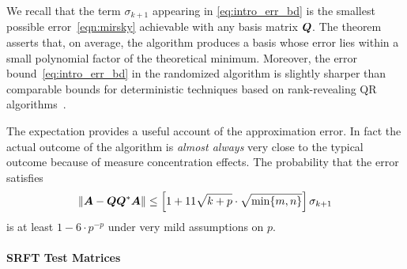\documentclass[12pt]{article}
\begin{document}
\lsp

We recall that the term $\sigma_{k+1}$ appearing in \eqref{eq:intro_err_bd}
is the smallest possible error~\eqref{eqn:mirsky} achievable with any basis
matrix $\bm{Q}$. The theorem asserts that, on average,
the algorithm produces a basis whose error lies within a small
polynomial factor of the theoretical minimum.
Moreover, the error bound~\eqref{eq:intro_err_bd} in the randomized
algorithm is slightly sharper than comparable bounds for
deterministic techniques based on rank-revealing QR algorithms~\cite{gu_rrqr}.

The expectation provides a
useful account of the approximation error. In fact the actual outcome
of the algorithm is {\em almost always} very close to
the typical outcome because of measure
concentration effects.  %
The probability that the error satisfies
\begin{equation} \label{eq:intro_err_prob}
\left\Vert { \bm{A} - \bm{QQ}^*\bm{A} } \right\Vert
    \leq \left[ 1 + 11 \sqrt{k+p} \cdot\sqrt{\min\{m,n\}} \right] \sigma_{k+1}
\end{equation}
is at least $1 - 6 \cdot p^{-p}$ under very mild assumptions on $p$. \cite[\S 10.3]{RM}

\paragraph{SRFT Test Matrices}
\label{sec:SRFTs}
\end{document}
